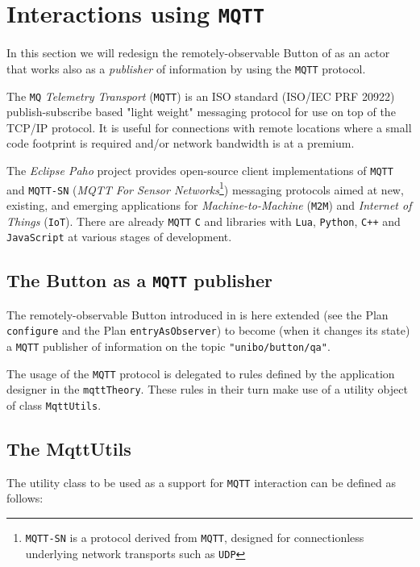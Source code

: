 \section{Interactions using \texttt{MQTT}}
In this section we will redesign the remotely-observable Button of  as an actor that works also as a \textit{publisher} of information  by using the \texttt{MQTT} protocol.

The \texttt{MQ} \textit{Telemetry Transport} (\texttt{MQTT}) is an ISO standard (ISO/IEC PRF 20922) publish-subscribe based "light weight" messaging protocol for use on top of the TCP/IP protocol. It is useful for connections with remote locations where a small code footprint is required and/or network bandwidth is at a premium.

The \textit{Eclipse Paho} project provides open-source client implementations of \texttt{MQTT} and \texttt{MQTT-SN} (\textit{MQTT For Sensor Networks}\footnote{\texttt{MQTT-SN} is a protocol derived from \texttt{MQTT}, designed for connectionless underlying network transports such as \texttt{UDP}}) messaging protocols aimed at new, existing, and emerging applications for \textit{Machine-to-Machine} (\texttt{M2M}) and \textit{Internet of Things} (\texttt{IoT}). There are already \texttt{MQTT} \texttt{C} and \java{} libraries with \texttt{Lua}, \texttt{Python}, \texttt{C++} and \texttt{JavaScript} at various stages of development.

\subsection{The Button as a \texttt{MQTT} publisher}
The remotely-observable Button introduced in  is here extended (see the Plan \texttt{configure} and the Plan \texttt{entryAsObserver}) to become (when it changes its state) a \texttt{MQTT} publisher of information on the topic \texttt{"unibo/button/qa"}.



The usage of the \texttt{MQTT} protocol is delegated to rules defined by the application designer in the \texttt{mqttTheory}. These rules in their turn make use of a \java{} utility object of class \texttt{MqttUtils}.

\subsection{The MqttUtils}
The \java{} utility class to be used as a support for \texttt{MQTT} interaction can be defined as follows:

